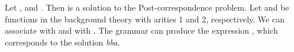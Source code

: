 \begin{example}
Let , and . Then  is a solution to the Post-correspondence problem. Let  and  be functions in the background theory  with arities 1 and 2, respectively. We can associate  with  and  with . 
The grammar  can produce the expression , which corresponds to the solution \emph{bba}. 
\end{example}




